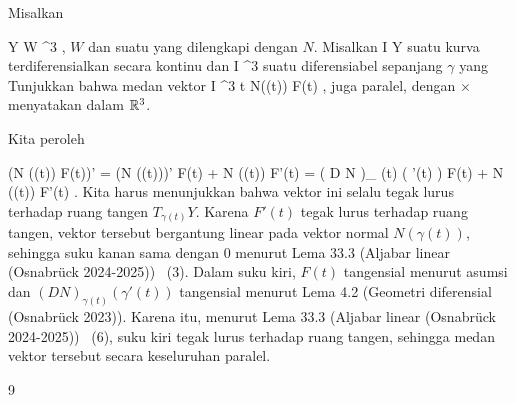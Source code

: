 {

Misalkan

\mavergleichskette
{\vergleichskette
{ Y
}
{ \subseteq }{ W
}
{ \subseteq }{ \R^3
}
{    }{
}
{   }{
}
}
{}{}{,}
$W$
dan suatu
yang dilengkapi dengan
$N$. Misalkan
\maabb {\gamma} { I } { Y
} {}
suatu kurva terdiferensialkan secara kontinu dan
 { I } { \R^3
} {}
suatu
diferensiabel sepanjang $\gamma$ yang
Tunjukkan bahwa medan vektor
\maabbeledisp {} { I } { \R^3
} { t } { N(\gamma(t)) \times F(t)
} {,}
juga paralel, dengan $\times$ menyatakan
dalam ${\mathbb R}^3$.

}
{

Kita peroleh

\mavergleichskettealign
{\vergleichskettealign
{ (N (\gamma(t)) \times F(t))'
}
{ =} { (N (\gamma(t)))' \times F(t) +  N (\gamma(t)) \times F'(t)
}
{ =} { \left(  D N   \right)_{ \gamma(t)} \left(   \gamma'(t)   \right)  \times F(t) +  N (\gamma(t)) \times F'(t)
}
{ } {
}
{ } {
}
}
{}
{}{.}
Kita harus menunjukkan bahwa vektor ini selalu tegak lurus terhadap ruang tangen $T_{\gamma(t)}Y$. Karena $F'(t)$ tegak lurus terhadap
ruang tangen, vektor tersebut bergantung linear pada vektor normal $N (\gamma(t))$, sehingga suku kanan sama dengan $0$ menurut
Lema 33.3 (Aljabar linear (Osnabrück 2024-2025))  (3).
Dalam suku kiri, $F(t)$ tangensial menurut asumsi dan $\left(  D N   \right)_{ \gamma(t)} \left(   \gamma'(t)   \right)$ tangensial menurut
Lema 4.2 (Geometri diferensial (Osnabrück 2023)).
Karena itu, menurut
Lema 33.3 (Aljabar linear (Osnabrück 2024-2025))  (6),
suku kiri tegak lurus terhadap ruang tangen, sehingga medan vektor tersebut secara keseluruhan paralel.

 }



{9}

